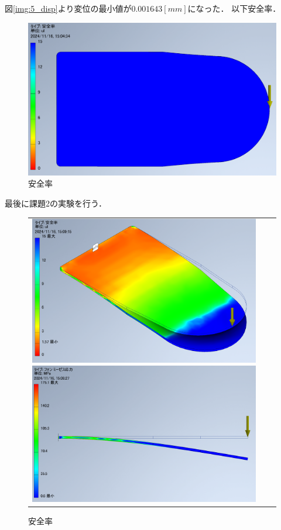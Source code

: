   図\ref{img:5_disp}より変位の最小値が$0.001643[mm]$になった．
  以下安全率．
  \begin{figure}[H]
    \centering
    \includegraphics[width=0.5\linewidth]{images/5_safe.png}
    \caption{安全率}
    \label{img:5_safe}
  \end{figure}

  最後に課題2の実験を行う．
  \begin{figure}[H]
    \begin{tabular}{ccc}
      \begin{minipage}{.33\textwidth}
        \centering
        \includegraphics[width=0.99\linewidth]{images/5-1_safe.png}
        \caption{安全率}
        \label{img:5-1_safe}
      \end{minipage}
      \begin{minipage}{.33\textwidth}
        \centering
        \includegraphics[width=0.99\linewidth]{images/5-1_voms.png}

\end{minipage}
\end{tabular}
\end{figure}
